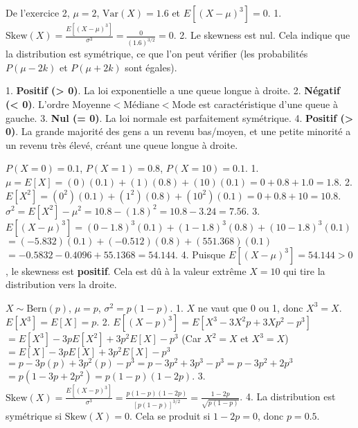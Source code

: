 \begin{correctionbox}
De l'exercice 2, $\mu=2$, $\text{Var}(X) = 1.6$ et $E[(X-\mu)^3] = 0$.
1.  $\text{Skew}(X) = \frac{E[(X-\mu)^3]}{\sigma^3} = \frac{0}{(1.6)^{3/2}} = 0$.
2.  Le skewness est nul. Cela indique que la distribution est symétrique, ce que l'on peut vérifier (les probabilités $P(\mu-2k)$ et $P(\mu+2k)$ sont égales).
\end{correctionbox}


\begin{correctionbox}
1.  \textbf{Positif (> 0)}. La loi exponentielle a une queue longue à droite.
2.  \textbf{Négatif (< 0)}. L'ordre $\text{Moyenne} < \text{Médiane} < \text{Mode}$ est caractéristique d'une queue à gauche.
3.  \textbf{Nul (= 0)}. La loi normale est parfaitement symétrique.
4.  \textbf{Positif (> 0)}. La grande majorité des gens a un revenu bas/moyen, et une petite minorité a un revenu très élevé, créant une queue longue à droite.
\end{correctionbox}

\begin{correctionbox}
$P(X=0)=0.1$, $P(X=1)=0.8$, $P(X=10)=0.1$.
1.  $\mu = E[X] = (0)(0.1) + (1)(0.8) + (10)(0.1) = 0 + 0.8 + 1.0 = 1.8$.
2.  $E[X^2] = (0^2)(0.1) + (1^2)(0.8) + (10^2)(0.1) = 0 + 0.8 + 10 = 10.8$.
    $\sigma^2 = E[X^2] - \mu^2 = 10.8 - (1.8)^2 = 10.8 - 3.24 = 7.56$.
3.  $E[(X-\mu)^3] = (0-1.8)^3(0.1) + (1-1.8)^3(0.8) + (10-1.8)^3(0.1)$
    $= (-5.832)(0.1) + (-0.512)(0.8) + (551.368)(0.1)$
    $= -0.5832 - 0.4096 + 55.1368 = 54.144$.
4.  Puisque $E[(X-\mu)^3] = 54.144 > 0$, le skewness est \textbf{positif}. Cela est dû à la valeur extrême $X=10$ qui tire la distribution vers la droite.
\end{correctionbox}

\begin{correctionbox}
$X \sim \text{Bern}(p)$, $\mu=p$, $\sigma^2=p(1-p)$.
1.  $X$ ne vaut que 0 ou 1, donc $X^3 = X$. $E[X^3] = E[X] = p$.
2.  $E[(X-p)^3] = E[X^3 - 3X^2p + 3Xp^2 - p^3]$
    $= E[X^3] - 3pE[X^2] + 3p^2E[X] - p^3$
    (Car $X^2=X$ et $X^3=X$)
    $= E[X] - 3pE[X] + 3p^2E[X] - p^3$
    $= p - 3p(p) + 3p^2(p) - p^3 = p - 3p^2 + 3p^3 - p^3 = p - 3p^2 + 2p^3$
    $= p(1 - 3p + 2p^2) = p(1-p)(1-2p)$.
3.  $\text{Skew}(X) = \frac{E[(X-p)^3]}{\sigma^3} = \frac{p(1-p)(1-2p)}{[p(1-p)]^{3/2}} = \frac{1-2p}{\sqrt{p(1-p)}}$.
4.  La distribution est symétrique si $\text{Skew}(X) = 0$. Cela se produit si $1-2p = 0$, donc $p=0.5$.
\end{correctionbox}

